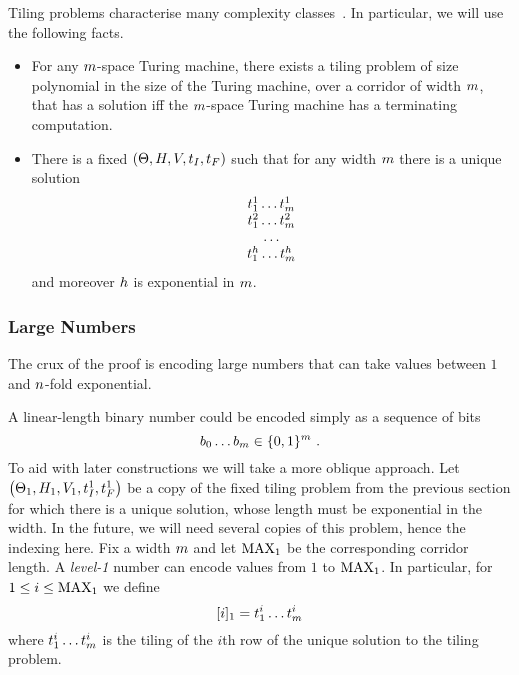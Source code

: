 Tiling problems characterise many complexity classes~\cite{??}.
In particular, we will use the following facts.
\begin{itemize}
\item
    For any $\linlen$-space Turing machine, there exists a tiling problem of size polynomial in the size of the Turing machine, over a corridor of width $\linlen$, that has a solution iff the $\linlen$-space Turing machine has a terminating computation.

\item
    There is a fixed
    $\tup{\tiles, \hrel, \vrel, \inittile, \fintile}$
    such that for any width $\linlen$ there is a unique solution
    \[
        \begin{array}{c}
            \tile^1_1 \ldots \tile^1_\linlen \\
            \tile^2_1 \ldots \tile^2_\linlen \\
            \ldots \\
            \tile^\tileheight_1 \ldots \tile^\tileheight_\linlen
        \end{array}
    \]
    and moreover $\tileheight$ is exponential in $\linlen$.
\end{itemize}

\subsubsection{Large Numbers}

The crux of the proof is encoding large numbers that can take values between $1$ and $\expheight$-fold exponential.

A linear-length binary number could be encoded simply as a sequence of bits
\[
    b_0 \ldots b_\linlen \in \set{0,1}^\linlen \ .
\]
To aid with later constructions we will take a more oblique approach.
Let
$\tup{\tilesnum{1}, \hrelnum{1}, \vrelnum{1}, \inittilenum{1}, \fintilenum{1}}$
be a copy of the fixed tiling problem from the previous section for which there is a unique solution, whose length must be exponential in the width.
In the future, we will need several copies of this problem, hence the indexing here.
Fix a width $\linlen$ and let $\nmax{1}$ be the corresponding corridor length.
A \emph{level-1} number can encode values from $1$ to $\nmax{1}$.
In particular, for $1 \leq i \leq \nmax{1}$ we define
\[
    \tenc{1}{i} = \tile^i_1 \ldots \tile^i_\linlen
\]
where
$\tile^i_1 \ldots \tile^i_\linlen$
is the tiling of the $i$th row of the unique solution to the tiling problem.

